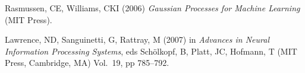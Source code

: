 \documentclass{article}
\begin{document}
%
%

\begin{thebibliography}{1}

Rasmussen, CE, Williams, CKI
\newblock (2006) \emph{Gaussian Processes for Machine Learning}
\newblock (MIT Press).

Lawrence, ND, Sanguinetti, G, Rattray, M
\newblock (2007) in \emph{Advances in Neural Information Processing Systems},
  eds{} Sch\"{o}lkopf, B, Platt, JC, Hofmann, T
\newblock (MIT Press, Cambridge, MA) Vol.{}~19, pp 785--792.

\end{thebibliography}
\end{document}
